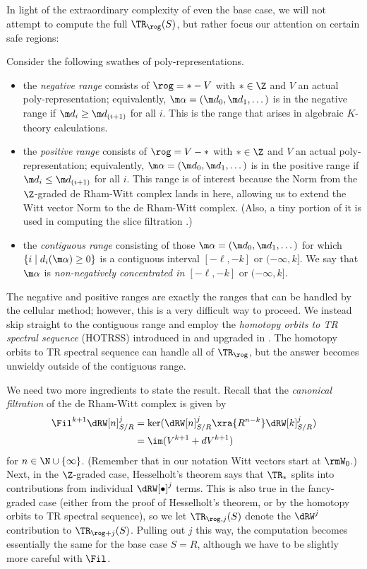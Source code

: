 In light of the extraordinary complexity of even the base case, we will not attempt to compute the full $\TR_\rog(S)$, but rather focus our attention on certain safe regions:
\begin{definition}
  Consider the following swathes of poly-representations.

  \begin{itemize}
    \item the \emph{negative range} consists of $\rog=*-V$ with $*\in\Z$ and $V$ an actual poly-representation; equivalently, $\m\alpha=(\m d_0,\m d_1,\dotsc)$ is in the negative range if $\m d_i \ge \m d_{(i+1)}$ for all $i$. This is the range that arises in algebraic $K$-theory calculations. 
    \item the \emph{positive range} consists of $\rog=V-*$ with $*\in\Z$ and $V$ an actual poly-representation; equivalently, $\m\alpha=(\m d_0,\m d_1,\dotsc)$ is in the positive range if $\m d_i \le \m d_{(i+1)}$ for all $i$. This range is of interest because the Norm from the $\Z$-graded de Rham-Witt complex lands in here, allowing us to extend the Witt vector Norm \cite{AngeltveitNorm,PrismsTambara1} to the de Rham-Witt complex. (Also, a tiny portion of it is used in computing the slice filtration \cite[Lemma 4.11]{SulSliceTHH}.)
  \item the \emph{contiguous range} consisting of those $\m\alpha=(\m d_0,\m d_1,\dotsc)$ for which $\{i \mid d_i(\m\alpha)\ge 0\}$ is a contiguous interval $[-\ell, -k]$ or $(-\infty, k]$. We say that $\m\alpha$ is \emph{non-negatively concentrated in $[-\ell, -k]$} or $(-\infty, k]$.
  \end{itemize}
\end{definition}

The negative and positive ranges are exactly the ranges that can be handled by the cellular method; however, this is a very difficult way to proceed. We instead skip straight to the contiguous range and employ the \emph{homotopy orbits to TR spectral sequence} (HOTRSS) introduced in \cite{ROS1TR} and upgraded in \cite{SulROGTHH}. The homotopy orbits to TR spectral sequence can handle all of $\TR_\rog$, but the answer becomes unwieldy outside of the contiguous range.

We need two more ingredients to state the result. Recall that the \emph{canonical filtration} of the de Rham-Witt complex is given by
\begin{align*}
  \Fil^{k+1} \dRW[n]^j_{S/R}
    &= \ker(\dRW[n]^j_{S/R} \xra{R^{n-k}} \dRW[k]^j_{S/R})\\
    &= \im(V^{k+1} + dV^{k+1})
\end{align*}
for $n\in\N\cup\{\infty\}$. (Remember that in our notation Witt vectors start at $\rmW_0$.) Next, in the $\Z$-graded case, Hesselholt's theorem \cite{LarsPTyp} says that $\TR_*$ splits into contributions from individual $\dRW[\bullet]^j$ terms. This is also true in the fancy-graded case (either from the proof of Hesselholt's theorem, or by the homotopy orbits to TR spectral sequence), so we let $\TR_{\rog,j}(S)$ denote the $\dRW^j$ contribution to $\TR_{\rog+j}(S)$. Pulling out $j$ this way, the computation becomes essentially the same for the base case $S=R$, although we have to be slightly more careful with $\Fil$.

